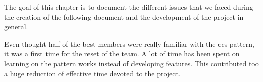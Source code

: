 The goal of this chapter is to document the different issues that we faced during the creation of the following document and the development of the project in general.

Even thought half of the best members were really familiar with the \gls{ecs} pattern, it was a first time for the reset of the team. A lot of time has been spent on learning on the pattern works instead of developing features. This contributed too a huge reduction of effective time devoted to the project. 
